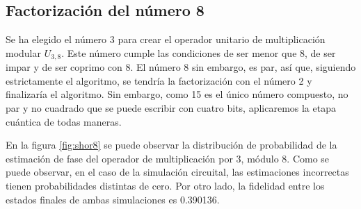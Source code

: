 \subsection{Factorización del número 8}

Se ha elegido el número 3 para crear el operador unitario de multiplicación modular $U_{3,8}$. Este número cumple las condiciones de ser menor que 8, de ser impar y de ser coprimo con 8. El número 8 sin embargo, es par, así que, siguiendo estrictamente el algoritmo, se tendría la factorización con el número 2 y finalizaría el algoritmo. Sin embargo, como 15 es el único número compuesto, no par y no cuadrado que se puede escribir con cuatro bits, aplicaremos la etapa cuántica de todas maneras.

En la figura \ref{fig:shor8} se puede observar la distribución de probabilidad de la estimación de fase del operador de multiplicación por 3, módulo 8. Como se puede observar, en el caso de la simulación circuital, las estimaciones incorrectas tienen probabilidades distintas de cero. Por otro lado, la fidelidad entre los estados finales de ambas simulaciones es 0.390136.

